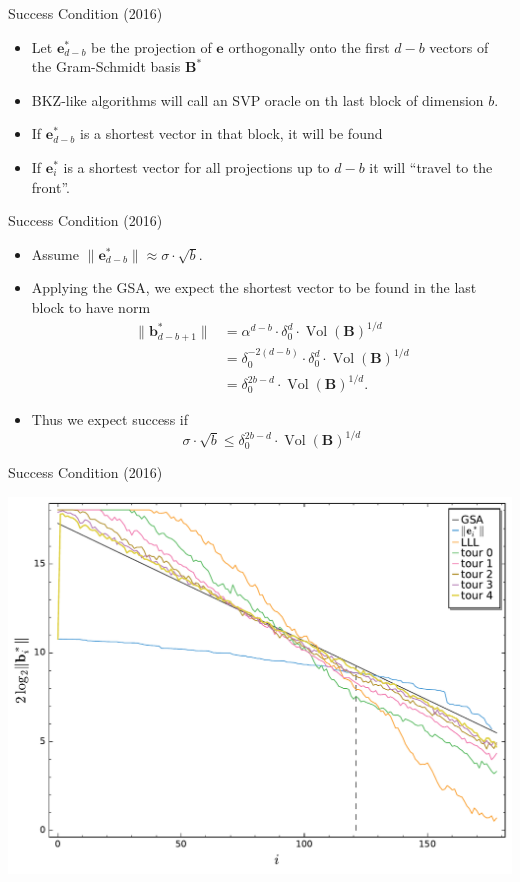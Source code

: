 \documentclass[presentation,smaller]{beamer}
\renewcommand{\vec}[1]{\mathbf{#1}\xspace}
\newcommand{\mat}[1]{\mathbf{#1}\xspace}
\DeclareMathOperator{\Vol}{Vol}
\begin{document}
\begin{frame}[label={sec:orge688f5f}]{Success Condition (2016)}
\begin{itemize}
\item Let \(\vec{e}^*_{d-b}\) be the projection of \(\vec{e}\) orthogonally onto the first \(d-b\) vectors of the Gram-Schmidt basis \(\mat{B}^*\)
\item BKZ-like algorithms will call an SVP oracle on th last block of dimension \(b\).
\item If \(\vec{e}^*_{d-b}\) is a shortest vector in that block, it will be found
\item If \(\vec{e}^*_i\) is a shortest vector for all projections up to \(d-b\) it will “travel to the front”.
\end{itemize}
\end{frame}

\begin{frame}[label={sec:orgb09b5a2}]{Success Condition (2016)}
\begin{itemize}
\item Assume \(\|\vec{e}^*_{d-b}\| ≈ σ ⋅ \sqrt{b}\).
\item Applying the GSA, we expect the shortest vector to be found in the last block to have norm
\begin{align*}
 \|\vec{b}_{d-b+1}^*\| &=  α^{d-b} ⋅ δ_0^d ⋅ {\Vol(\mat{B})}^{1/d}\\
                       &= δ_0^{-2(d-b)} ⋅ δ_0^d ⋅ {\Vol(\mat{B})}^{1/d}\\
                       &= δ_0^{2b-d} ⋅ {\Vol(\mat{B})}^{1/d}.
\end{align*}
\item Thus  we expect success if \[σ ⋅ \sqrt{b} ≤ δ_0^{2b-d} ⋅ {\Vol(\mat{B})}^{1/d}\]
\end{itemize}
\end{frame}

\begin{frame}[label={sec:org074689d}]{Success Condition (2016)}
\begin{center}
\includegraphics[width=.9\linewidth]{./usvp-2016-visualisation.pdf}
\end{center}
\end{frame}
\end{document}
